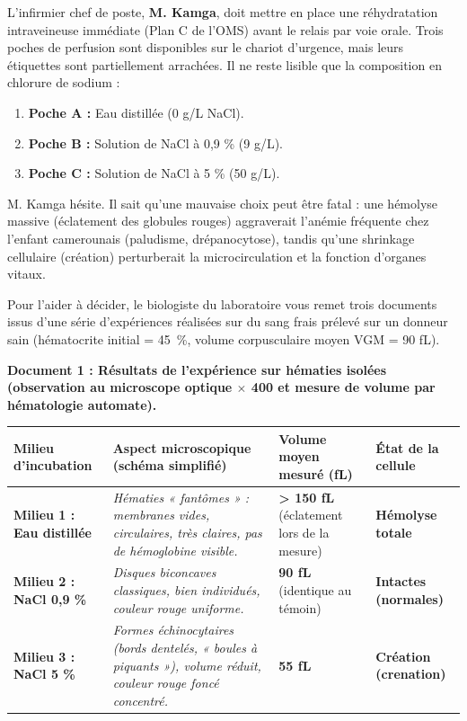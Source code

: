 \documentclass[11pt]{article}
\begin{document}
L'infirmier chef de poste, \textbf{M. Kamga}, doit mettre en place une réhydratation intraveineuse immédiate (Plan C de l'OMS) avant le relais par voie orale. Trois poches de perfusion sont disponibles sur le chariot d'urgence, mais leurs étiquettes sont partiellement arrachées. Il ne reste lisible que la composition en chlorure de sodium :
\begin{enumerate}
    \item \textbf{Poche A :} Eau distillée (0 g/L NaCl).
    \item \textbf{Poche B :} Solution de NaCl à 0,9 \% (9 g/L).
    \item \textbf{Poche C :} Solution de NaCl à 5 \% (50 g/L).
\end{enumerate}

M. Kamga hésite. Il sait qu'une mauvaise choix peut être fatal : une hémolyse massive (éclatement des globules rouges) aggraverait l'anémie fréquente chez l'enfant camerounais (paludisme, drépanocytose), tandis qu'une shrinkage cellulaire (création) perturberait la microcirculation et la fonction d'organes vitaux.

Pour l'aider à décider, le biologiste du laboratoire vous remet trois documents issus d'une série d'expériences réalisées sur du sang frais prélevé sur un donneur sain (hématocrite initial = 45~\%, volume corpusculaire moyen VGM = 90 fL).

\medskip
\noindent\textbf{Document 1 : Résultats de l'expérience sur hématies isolées (observation au microscope optique $\times$ 400 et mesure de volume par hématologie automate).}

\begin{center}
\begin{tabularx}{\linewidth}{|l|X|X|X|}\hline
\rowcolor{popblueL}
\textbf{Milieu d'incubation} & \textbf{Aspect microscopique (schéma simplifié)} & \textbf{Volume moyen mesuré (fL)} & \textbf{État de la cellule} \\ \hline
\textbf{Milieu 1 : Eau distillée} & \textit{Hématies « fantômes » : membranes vides, circulaires, très claires, pas de hémoglobine visible.} & \textbf{> 150 fL} (éclatement lors de la mesure) & \textbf{Hémolyse totale} \\ \hline
\textbf{Milieu 2 : NaCl 0,9 \%} & \textit{Disques biconcaves classiques, bien individués, couleur rouge uniforme.} & \textbf{90 fL} (identique au témoin) & \textbf{Intactes (normales)} \\ \hline
\textbf{Milieu 3 : NaCl 5 \%} & \textit{Formes échinocytaires (bords dentelés, « boules à piquants »), volume réduit, couleur rouge foncé concentré.} & \textbf{55 fL} & \textbf{Création (crenation)} \\ \hline
\end{tabularx}
\end{center}
\end{document}
